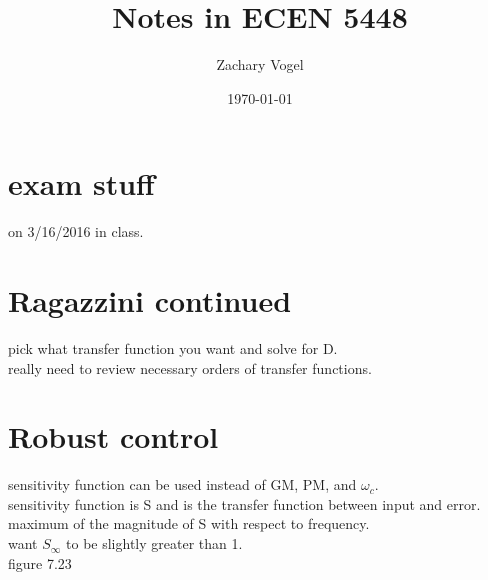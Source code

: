 \documentclass{article}
\author{Zachary Vogel}
\date{\today}
\title{Notes in ECEN 5448}
\begin{document}
\maketitle


\section*{exam stuff}
on 3/16/2016 in class.\\

\section*{Ragazzini continued}
pick what transfer function you want and solve for D.\\

really need to review necessary orders of transfer functions.\\

\section*{Robust control}
sensitivity function can be used instead of GM, PM, and $\omega_c$.\\
sensitivity function is S and is the transfer function between input and error.\\
maximum of the magnitude of S with respect to frequency.\\
want $S_\infty$ to be slightly greater than 1.\\
figure 7.23\\
\end{document}
